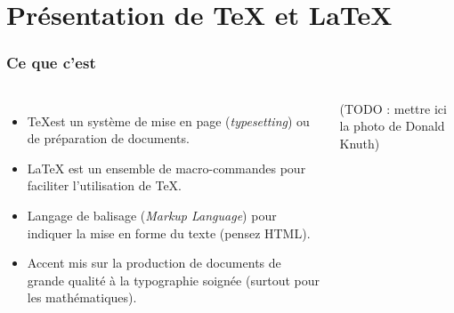\section{Présentation de {\TeX} et \LaTeX}


\begin{frame}

	\frametitle{Ce que c'est}
	
	\begin{columns}
		
			\begin{itemize}
				
				\item \TeX est un système de mise en	page (\emph{typesetting}) ou de
				préparation de documents.
				
				\item {\LaTeX} est un ensemble de macro-commandes pour faciliter l’utilisation de \TeX.
				
				\item Langage de balisage (\emph{Markup Language}) pour indiquer la	mise en forme
					du texte (pensez HTML).
					
				\item Accent mis sur la production de documents de grande qualité à la typographie
					soignée (surtout pour les mathématiques).
			\end{itemize}
		
		
			(TODO : mettre ici la photo de Donald Knuth)
	\end{columns}

\end{frame}



